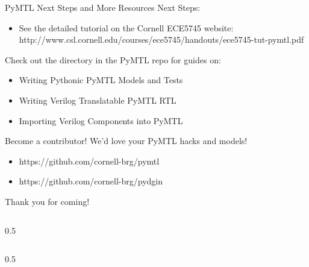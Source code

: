 \begin{frame}{PyMTL Next Steps and More Resources}
Next Steps:
\begin{itemize}
  \item See the detailed tutorial on the Cornell ECE5745 website:
        \footnotesize{http://www.csl.cornell.edu/courses/ece5745/handouts/ece5745-tut-pymtl.pdf}
\end{itemize}

\smallskip
Check out the  directory in the PyMTL repo for guides on:
\begin{itemize}
  \item Writing Pythonic PyMTL Models and Tests
  \item Writing Verilog Translatable PyMTL RTL
  \item Importing Verilog Components into PyMTL
\end{itemize}

\smallskip
Become a contributor! We'd love your PyMTL hacks and models!
\begin{itemize}
  \item https://github.com/cornell-brg/pymtl
  \item https://github.com/cornell-brg/pydgin
\end{itemize}
\end{frame}

\begin{frame}{Thank you for coming!}
  \begin{cbxcols}
  \begin{column}{0.5\tw}
  \vspace{.2in}

  \vspace{.3in}

  \vspace{.363in}
  \centering{[ MICRO 2014 ]}
  \end{column}

  \begin{column}{0.5\tw}
  \vspace{.2in}

  \vspace{.3in}

  \vspace{.2in}
  \centering{[ ISPASS 2015 ]}

  \end{column}
  \end{cbxcols}
\end{frame}
